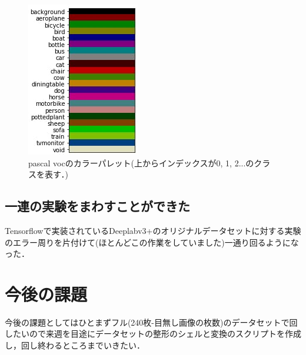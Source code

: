 \documentclass[onecolumn]{ujarticle}   %
\begin{document}
	\begin{figure}[h]
		\centering
		\includegraphics[width=0.8\columnwidth]{color_palette.jpg}
		\caption{pascal vocのカラーパレット(上からインデックスが0, 1, 2...のクラスを表す．)}
		\label{fig:color_palette}
	\end{figure}

	\subsection{一連の実験をまわすことができた}
	Tensorflowで実装されているDeeplabv3+のオリジナルデータセットに対する実験のエラー周りを片付けて(ほとんどこの作業をしていました)一通り回るようになった．

	\section{今後の課題}
	今後の課題としてはひとまずフル(240枚-目無し画像の枚数)のデータセットで回したいので来週を目途にデータセットの整形のシェルと変換のスクリプトを作成し，回し終わるところまでいきたい．

	
\end{document}
